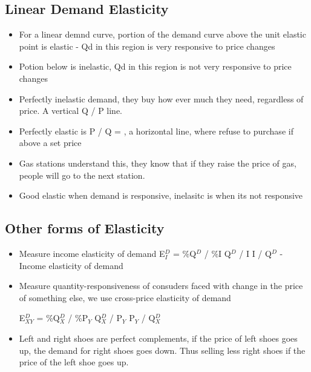 \documentclass{article}
\begin{document}
\subsection{Linear Demand Elasticity}
\begin{itemize}
  \item For a linear demnd curve,
    portion of the demand curve above the unit elastic point is elastic
    - Qd in this region is very responsive to price changes
  \item Potion below is inelastic,
    Qd in this region is not very responsive to price changes
  \item Perfectly inelastic demand, they buy how ever much they need,
    regardless of price. A vertical \Delta Q / \Delta P line.
  \item Perfectly elastic is \Delta P / \Delta Q = \infty,
    a horizontal line, where refuse to purchase if above a set price
  \item Gas stations understand this,
    they know that if they raise the price of gas, people will go to the next station.
  \item Good elastic when demand is responsive, inelasitc is when its not responsive
\end{itemize}

\subsection{Other forms of Elasticity}
\begin{itemize}
  \item Measure income elasticity of demand
    E$^D_I$ = \%\Delta Q$^D$ / \%\Delta I
    \Rightarrow{} \Delta Q$^D$ / \Delta I \times{} I / Q$^D$
    - Income elasticity of demand
  \item Measure quantity-responsiveness of consuders faced with
    change in the price of something else, we use cross-price elasticity of demand

    E$^{D}_{XY}$ = \%\Delta Q$^D_X$ / \%\Delta P$_Y$
    \Rightarrow{} \Delta Q$^D_X$ / \Delta P$_Y$ \times{} P$_Y$ / Q$^D_X$
  \item Left and right shoes are perfect complements,
    if the price of left shoes goes up, the demand for right shoes goes down.
    Thus selling less right shoes if the price of the left shoe goes up.
\end{itemize}
\end{document}
